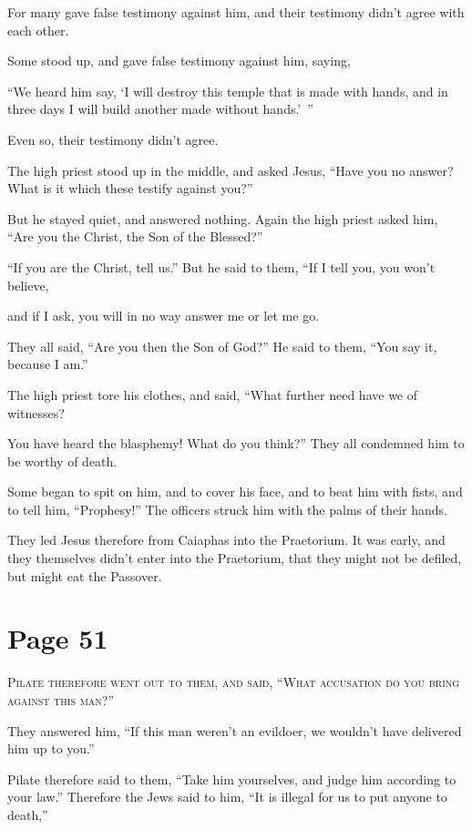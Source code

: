 For many gave false testimony against him, and their testimony didn’t agree with each other.

Some stood up, and gave false testimony against him, saying,

“We heard him say, ‘I will destroy this temple that is made with hands, and in three days I will build another made without hands.’ ”

Even so, their testimony didn’t agree.

The high priest stood up in the middle, and asked Jesus, “Have you no answer? What is it which these testify against you?”

But he stayed quiet, and answered nothing. Again the high priest asked him, “Are you the Christ, the Son of the Blessed?”

“If you are the Christ, tell us.” But he said to them, “If I tell you, you won’t believe,

and if I ask, you will in no way answer me or let me go.

They all said, “Are you then the Son of God?” He said to them, “You say it, because I am.”

The high priest tore his clothes, and said, “What further need have we of witnesses?

You have heard the blasphemy! What do you think?” They all condemned him to be worthy of death.

Some began to spit on him, and to cover his face, and to beat him with fists, and to tell him, “Prophesy!” The officers struck him with the palms of their hands.

They led Jesus therefore from Caiaphas into the Praetorium. It was early, and they themselves didn’t enter into the Praetorium, that they might not be defiled, but might eat the Passover.



\chapterornament
\section*{Page 51}

\lettrine{P}{ilate therefore went out to them, and said, “What accusation do you bring against this man?”}

They answered him, “If this man weren’t an evildoer, we wouldn’t have delivered him up to you.”

Pilate therefore said to them, “Take him yourselves, and judge him according to your law.” Therefore the Jews said to him, “It is illegal for us to put anyone to death,”

